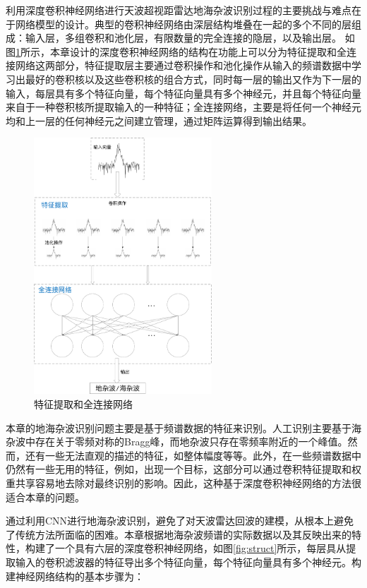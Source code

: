 利用深度卷积神经网络进行天波超视距雷达地海杂波识别过程的主要挑战与难点在于网络模型的设计。典型的卷积神经网络由深层结构堆叠在一起的多个不同的层组成：输入层，多组卷积和池化层，有限数量的完全连接的隐层，以及输出层。
如图\ref{fig:fullconnect}所示，本章设计的深度卷积神经网络的结构在功能上可以分为特征提取和全连接网络这两部分，特征提取层主要通过卷积操作和池化操作从输入的频谱数据中学习出最好的卷积核以及这些卷积核的组合方式，同时每一层的输出又作为下一层的输入，每层具有多个特征向量，每个特征向量具有多个神经元，并且每个特征向量来自于一种卷积核所提取输入的一种特征；全连接网络，主要是将任何一个神经元均和上一层的任何神经元之间建立管理，通过矩阵运算得到输出结果。
\begin{figure}[hbt]
	\centering
	\includegraphics[width=6.67cm]{figures/othr/fullconnect}
	\caption{特征提取和全连接网络}
	\label{fig:fullconnect}
\end{figure}

本章的地海杂波识别问题主要是基于频谱数据的特征来识别。人工识别主要基于海杂波中存在关于零频对称的Bragg峰，而地杂波只存在零频率附近的一个峰值。然而，还有一些无法直观的描述的特征，如整体幅度等等。此外，在一些频谱数据中仍然有一些无用的特征，例如，出现一个目标，这部分可以通过卷积特征提取和权重共享容易地去除对最终识别的影响。因此，这种基于深度卷积神经网络的方法很适合本章的问题。

通过利用CNN进行地海杂波识别，避免了对天波雷达回波的建模，从根本上避免了传统方法所面临的困难。本章根据地海杂波频谱的实际数据以及其反映出来的特性，构建了一个具有六层的深度卷积神经网络，如图\ref{fig:struct}所示，每层具从提取输入的卷积滤波器的特征导出多个特征向量，每个特征向量具有多个神经元。构建神经网络结构的基本步骤为：

